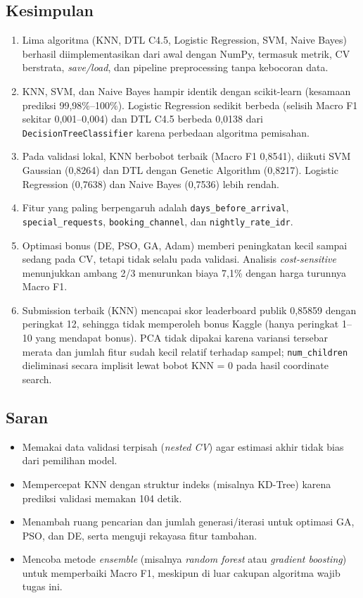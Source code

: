 \documentclass[12pt,a4paper]{article}
\begin{document}
\subsection{Kesimpulan}
\begin{enumerate}
\item Lima algoritma (KNN, DTL C4.5, Logistic Regression, SVM, Naive Bayes) berhasil diimplementasikan dari awal dengan NumPy, termasuk metrik, CV berstrata, \textit{save/load}, dan pipeline preprocessing tanpa kebocoran data.
\item KNN, SVM, dan Naive Bayes hampir identik dengan scikit-learn (kesamaan prediksi 99,98\%--100\%). Logistic Regression sedikit berbeda (selisih Macro F1 sekitar 0,001--0,004) dan DTL C4.5 berbeda 0,0138 dari \texttt{DecisionTreeClassifier} karena perbedaan algoritma pemisahan.
\item Pada validasi lokal, KNN berbobot terbaik (Macro F1 0,8541), diikuti SVM Gaussian (0,8264) dan DTL dengan Genetic Algorithm (0,8217). Logistic Regression (0,7638) dan Naive Bayes (0,7536) lebih rendah.
\item Fitur yang paling berpengaruh adalah \texttt{days\_before\_arrival}, \texttt{special\_requests}, \texttt{booking\_channel}, dan \texttt{nightly\_rate\_idr}.
\item Optimasi bonus (DE, PSO, GA, Adam) memberi peningkatan kecil sampai sedang pada CV, tetapi tidak selalu pada validasi. Analisis \textit{cost-sensitive} menunjukkan ambang 2/3 menurunkan biaya 7,1\% dengan harga turunnya Macro F1.
\item Submission terbaik (KNN) mencapai skor leaderboard publik 0,85859 dengan peringkat 12, sehingga tidak memperoleh bonus Kaggle (hanya peringkat 1--10 yang mendapat bonus). PCA tidak dipakai karena variansi tersebar merata dan jumlah fitur sudah kecil relatif terhadap sampel; \texttt{num\_children} dieliminasi secara implisit lewat bobot KNN = 0 pada hasil coordinate search.
\end{enumerate}

\subsection{Saran}
\begin{itemize}
\item Memakai data validasi terpisah (\textit{nested CV}) agar estimasi akhir tidak bias dari pemilihan model.
\item Mempercepat KNN dengan struktur indeks (misalnya KD-Tree) karena prediksi validasi memakan 104 detik.
\item Menambah ruang pencarian dan jumlah generasi/iterasi untuk optimasi GA, PSO, dan DE, serta menguji rekayasa fitur tambahan.
\item Mencoba metode \textit{ensemble} (misalnya \textit{random forest} atau \textit{gradient boosting}) untuk memperbaiki Macro F1, meskipun di luar cakupan algoritma wajib tugas ini.
\end{itemize}
\end{document}

